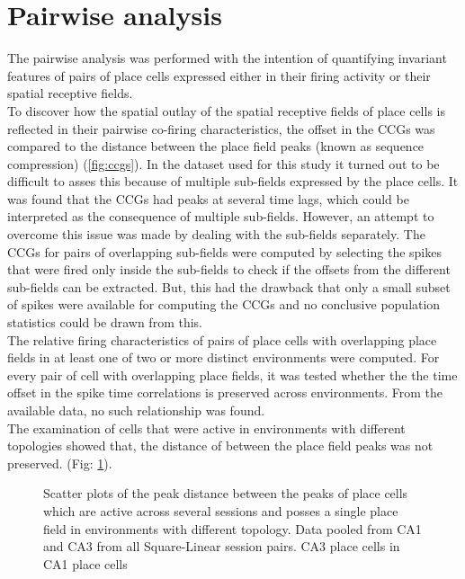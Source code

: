\section{Pairwise analysis}
The pairwise analysis was performed with the intention of quantifying invariant features of pairs of place cells expressed either in their firing activity or their spatial receptive fields.\\ To discover how the spatial outlay of the spatial receptive fields of place cells is reflected in their pairwise co-firing characteristics, the offset in the CCGs was compared to the distance between the place field peaks (known as sequence compression) \cite{Dragoi2006, Skaggs1996c, Geisler2007} (\autoref{fig:ccgs}). In the dataset used for this study it turned out to be difficult to asses this because of multiple sub-fields expressed by the place cells. It was found that the CCGs had peaks at several time lags, which could be interpreted as the consequence of multiple sub-fields. However, an attempt to overcome this issue was made by dealing with the sub-fields separately.  The CCGs for pairs of overlapping sub-fields were computed by selecting the spikes that were fired only inside the sub-fields to check if the offsets from the different sub-fields can be extracted. But, this had the drawback that only a small subset of spikes were available for computing the CCGs and no conclusive population statistics could be drawn from this.  \\

The relative firing characteristics of pairs of place cells with overlapping place fields in at least one of two or more distinct environments were computed. For every pair of cell with overlapping place fields, it was tested whether the the time offset in the spike time correlations is preserved across environments. From the available data, no such relationship was found.  \\
The examination of cells that were active in environments with different topologies showed that, the distance of between the place field peaks was not preserved. (Fig: \ref{fig:pkDist}).



\begin{figure}[htb!]
\centering
{}
\caption[Place field peak distances]{Scatter plots of the peak distance between the peaks of place cells which are active across several sessions and posses a single place field in environments with different topology. Data pooled from CA1 and CA3  from all Square-Linear session pairs.   CA3 place cells in   CA1 place cells }
\label{fig:pkDist}
\end{figure}

